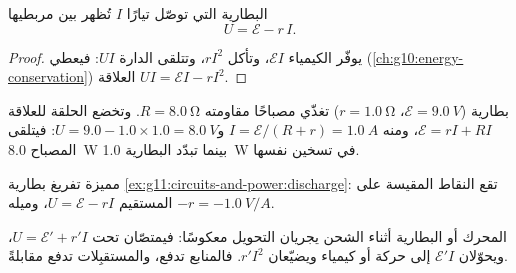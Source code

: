 \begin{proposition}\label{prop:g11:circuits-and-power:terminal}
البطارية التي توصّل تيارًا $I$ تُظهر بين مربطيها
\[ U = \mathcal{E} - r\,I . \]
\end{proposition}

\begin{proof}
يوفّر الكيمياء $\mathcal{E}I$، وتأكل 
$rI^2$، وتتلقى الدارة $UI$: فيعطي 
(\cref{ch:g10:energy-conservation}) العلاقة $UI = \mathcal{E}I - rI^2$.
\end{proof}

\begin{example}\label{ex:g11:circuits-and-power:discharge}
بطارية ($\mathcal{E} = \qty{9.0}{V}$، $r = \qty{1.0}{\ohm}$) تغذّي
مصباحًا مقاومته $R = \qty{8.0}{\ohm}$. وتخضع الحلقة للعلاقة $\mathcal{E} =
rI + RI$، ومنه $I = \mathcal{E}/(R + r) = \qty{1.0}{A}$ و$U = 9.0 -
1.0 \times 1.0 = \qty{8.0}{V}$: فيتلقى المصباح \qty{8.0}{W} بينما
تبدّد البطارية \qty{1.0}{W} في تسخين نفسها.
\end{example}

\begin{omfigure}

{\small مميزة تفريغ بطارية
\cref{ex:g11:circuits-and-power:discharge}: تقع النقاط المقيسة على
المستقيم $U = \mathcal{E} - rI$، وميله $-r = \qty{-1.0}{V/A}$.}
\end{omfigure}

\begin{remark}\label{rem:g11:circuits-and-power:receivers}
المحرك أو البطارية أثناء الشحن يجريان التحويل معكوسًا: فيمتصّان
تحت $U = \mathcal{E}' + r'I$، ويحوّلان $\mathcal{E}'I$ إلى حركة أو
كيمياء ويضيّعان $r'I^2$. فالمنابع تدفع، والمستقبِلات تدفع مقابلةً.
\end{remark}

